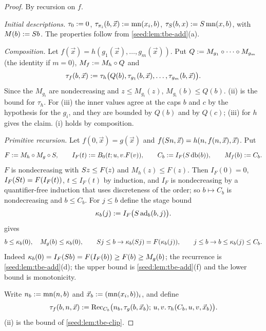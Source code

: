 \begin{proof}
By recursion on $f$.

\emph{Initial descriptions.} $\tau_0\mathrel{:=}0$,
$\tau_{\pi_i}(b,\vec x)\mathrel{:=}\operatorname{mn}(x_i,b)$,
$\tau_{S}(b,x)\mathrel{:=}S\operatorname{mn}(x,b)$, with $M(b)\mathrel{:=}S b$.
The properties follow from \cref{seed:lem:tbe-add}(a).

\emph{Composition.} Let $f(\vec x)=h(g_1(\vec x),\ldots,g_m(\vec x))$. Put
$Q\mathrel{:=} M_{g_1}\circ\cdots\circ M_{g_m}$ (the identity if $m=0$),
$M_f\mathrel{:=} M_h\circ Q$ and
\[
 \tau_f(b,\vec x)\mathrel{:=}
 \tau_h\bigl(Q(b),\tau_{g_1}(b,\vec x),\ldots,\tau_{g_m}(b,\vec x)\bigr).
\]
Since the $M_{g_i}$ are nondecreasing and $z\leq M_{g_i}(z)$,
$M_{g_i}(b)\leq Q(b)$. (ii) is the bound for $\tau_h$. For (iii) the inner
values agree at the caps $b$ and $c$ by the hypothesis for the $g_i$, and
they are bounded by $Q(b)$ and by $Q(c)$; (iii) for $h$ gives the claim. (i)
holds by composition.

\emph{Primitive recursion.} Let $f(0,\vec x)=g(\vec x)$ and
$f(S n,\vec x)=h(n,f(n,\vec x),\vec x)$. Put
\[
 F\mathrel{:=} M_h\circ M_g\circ S,\qquad
 I_F(t)\mathrel{:=} B_0(t;u,v.F(v)),\qquad
 C_b\mathrel{:=} I_F(S\operatorname{db}(b)),\qquad M_f(b)\mathrel{:=} C_b .
\]
$F$ is nondecreasing with $S z\leq F(z)$ and $M_h(z)\leq F(z)$. Then
$I_F(0)=0$, $I_F(S t)=F(I_F(t))$, $t\leq I_F(t)$ by induction, and $I_F$
is nondecreasing by a quantifier-free induction that uses discreteness of the
order; so $b\mapsto C_b$ is nondecreasing and $b\leq C_b$. For $j\leq b$
define the stage bound
\[
 \kappa_b(j)\mathrel{:=} I_F\bigl(S\operatorname{ad}_b(b,j)\bigr).
\]
 gives
\begin{equation}\label{seed:eq:stage}
 b\leq\kappa_b(0),\quad M_g(b)\leq\kappa_b(0),\qquad
 S j\leq b\to\kappa_b(S j)=F(\kappa_b(j)),\qquad
 j\leq b\to b\leq\kappa_b(j)\leq C_b .
\end{equation}
Indeed $\kappa_b(0)=I_F(S b)=F(I_F(b))\geq F(b)\geq M_g(b)$; the
recurrence is \cref{seed:lem:tbe-add}(d); the upper bound is
\cref{seed:lem:tbe-add}(f) and the lower bound is monotonicity.

Write $n_b\mathrel{:=}\operatorname{mn}(n,b)$ and
$\vec x_b\mathrel{:=}(\operatorname{mn}(x_i,b))_i$, and define
\[
 \tau_f(b,n,\vec x)\mathrel{:=}
 \operatorname{Rec}_{C_b}\bigl(n_b,\tau_g(b,\vec x_b);\,
 u,v.\,\tau_h(C_b,u,v,\vec x_b)\bigr).
\]
(ii) is the bound of \cref{seed:lem:tbe-clip}.


\end{proof}
